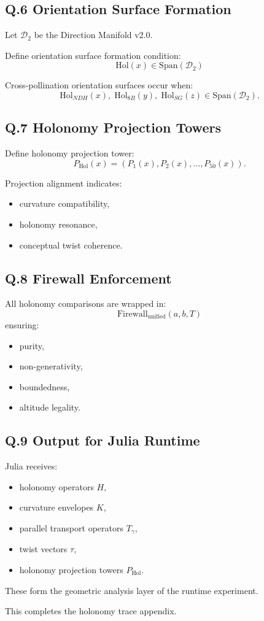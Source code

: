 \subsection*{Q.6 Orientation Surface Formation}

Let $\mathcal{D}_2$ be the Direction Manifold v2.0.

Define orientation surface formation condition:
\[
\mathrm{Hol}(x) \in \mathrm{Span}(\mathcal{D}_2)
\]

Cross-pollination orientation surfaces occur when:
\[
\mathrm{Hol}_{NDH}(x),\;
\mathrm{Hol}_{8B}(y),\;
\mathrm{Hol}_{SG}(z)
\in
\mathrm{Span}(\mathcal{D}_2).
\]

\subsection*{Q.7 Holonomy Projection Towers}

Define holonomy projection tower:
\[
P_{\mathrm{Hol}}(x)
=
(P_1(x), P_2(x), \dots, P_{50}(x)).
\]

Projection alignment indicates:
\begin{itemize}
    \item curvature compatibility,
    \item holonomy resonance,
    \item conceptual twist coherence.
\end{itemize}

\subsection*{Q.8 Firewall Enforcement}

All holonomy comparisons are wrapped in:
\[
\mathrm{Firewall}_{\mathrm{unified}}(a,b,T)
\]
ensuring:
\begin{itemize}
    \item purity,
    \item non-generativity,
    \item boundedness,
    \item altitude legality.
\end{itemize}

\subsection*{Q.9 Output for Julia Runtime}

Julia receives:
\begin{itemize}
    \item holonomy operators $H$,
    \item curvature envelopes $K$,
    \item parallel transport operators $T_{\gamma}$,
    \item twist vectors $\tau$,
    \item holonomy projection towers $P_{\mathrm{Hol}}$.
\end{itemize}

These form the geometric analysis layer of the runtime experiment.

This completes the holonomy trace appendix.
